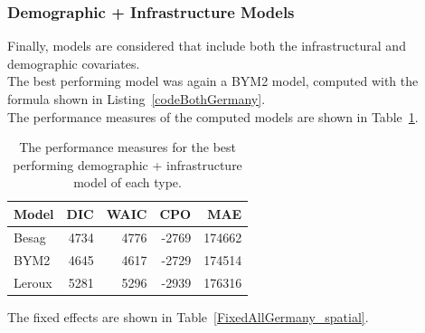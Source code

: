 \subsubsection{Demographic + Infrastructure Models}
Finally, models are considered that include both the infrastructural and demographic covariates. \\
The best performing model was again a BYM2 model, computed with the formula shown in Listing~\ref{codeBothGermany}. \\
The performance measures of the computed models are shown in Table~\ref{allGermany}.
\begin{table}[H] 
\caption{The performance measures for the best performing demographic + infrastructure model of each type. \label{allGermany}}
\begin{tabular}{l r r r r}
\toprule
\textbf{Model}	& \textbf{DIC}	& \textbf{WAIC} & \textbf{CPO} & \textbf{MAE}\\
\midrule
Besag&  4734 & 4776 & -2769 & 174662\\
BYM2 & 4645 & 4617 & -2729 & 174514\\
Leroux & 5281 & 5296 & -2939 & 176316 \\
\bottomrule
\end{tabular}
\end{table}
The fixed effects are shown in Table~\ref{FixedAllGermany_spatial}.
